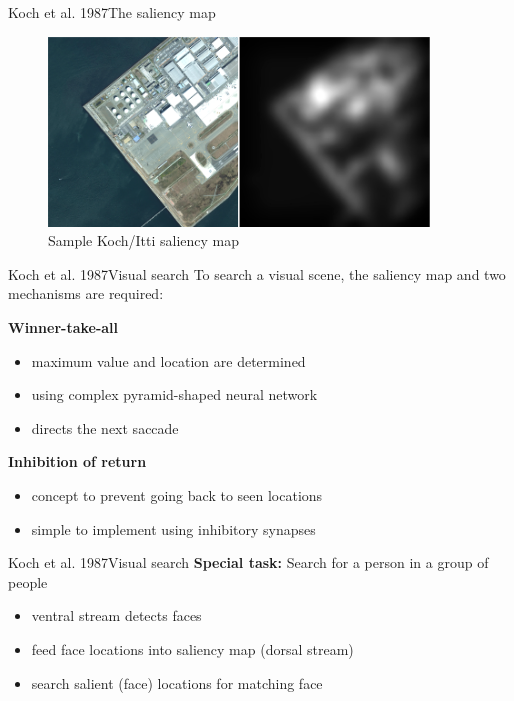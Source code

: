 \documentclass[compress,t]{beamer}
\begin{document}
\begin{frame}{Koch et al. 1987}{The saliency map}
    \begin{figure}
        \includegraphics[width=0.9\textwidth]{graphics/koch.png}
        \caption{Sample Koch/Itti saliency map}
        \label{fig:koch-example}
    \end{figure}
\end{frame}


\begin{frame}{Koch et al. 1987}{Visual search}
    To search a visual scene, the saliency map and two mechanisms are required: 

    \pause

    \textbf{Winner-take-all}
    \begin{itemize}
        \item maximum value and location are determined
        \item using complex pyramid-shaped neural network 
        \item directs the next saccade
    \end{itemize}

    \pause

    \textbf{Inhibition of return}
    \begin{itemize}
        \item concept to prevent going back to seen locations
        \item simple to implement using inhibitory synapses
    \end{itemize}
\end{frame}

\begin{frame}{Koch et al. 1987}{Visual search}
    \textbf{Special task:} Search for a person in a group of people

    \begin{itemize}
        \item ventral stream detects faces
        \item feed face locations into saliency map (dorsal stream)
        \item search salient (face) locations for matching face
    \end{itemize}
\end{frame}
\end{document}
